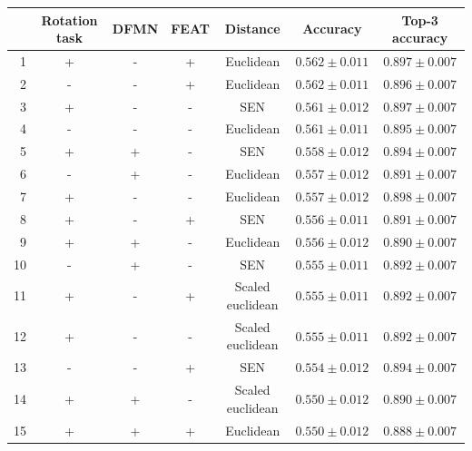 \documentclass[a4paper, 12pt]{report}
\begin{document}
\begin{table}[h!]
\begin{adjustbox}{center}
\begin{tabular}{| r | c c c c | c |  c | }
\hline
    & Rotation task   & DFMN   & FEAT   & Distance         & Accuracy         & Top-3 accuracy   \\
    \hline
  1 & +               & -      & +      & Euclidean        & $0.562 \pm 0.011$ & $0.897 \pm 0.007$ \\
    \hline
  2 & -               & -      & +      & Euclidean        & $0.562 \pm 0.011$ & $0.896 \pm 0.007$ \\
    \hline
  3 & +               & -      & -      & SEN              & $0.561 \pm 0.012$ & $0.897 \pm 0.007$ \\
    \hline
  4 & -               & -      & -      & Euclidean        & $0.561 \pm 0.011$ & $0.895 \pm 0.007$ \\
    \hline
  5 & +               & +      & -      & SEN              & $0.558 \pm 0.012$ & $0.894 \pm 0.007$ \\
    \hline
  6 & -               & +      & -      & Euclidean        & $0.557 \pm 0.012$ & $0.891 \pm 0.007$ \\
    \hline
  7 & +               & -      & -      & Euclidean        & $0.557 \pm 0.012$ & $0.898 \pm 0.007$ \\
    \hline
  8 & +               & -      & +      & SEN              & $0.556 \pm 0.011$ & $0.891 \pm 0.007$ \\
    \hline
  9 & +               & +      & -      & Euclidean        & $0.556 \pm 0.012$ & $0.890 \pm 0.007$ \\
    \hline
 10 & -               & +      & -      & SEN              & $0.555 \pm 0.011$ & $0.892 \pm 0.007$ \\
    \hline
 11 & +               & -      & +      & Scaled euclidean & $0.555 \pm 0.011$ & $0.892 \pm 0.007$ \\
    \hline
 12 & +               & -      & -      & Scaled euclidean & $0.555 \pm 0.011$ & $0.892 \pm 0.007$ \\
    \hline
 13 & -               & -      & +      & SEN              & $0.554 \pm 0.012$ & $0.894 \pm 0.007$ \\
    \hline
 14 & +               & +      & -      & Scaled euclidean & $0.550 \pm 0.012$ & $0.890 \pm 0.007$ \\
    \hline
 15 & +               & +      & +      & Euclidean        & $0.550 \pm 0.012$ & $0.888 \pm 0.007$ \\

\end{tabular}
\end{adjustbox}
\end{table}
\end{document}
